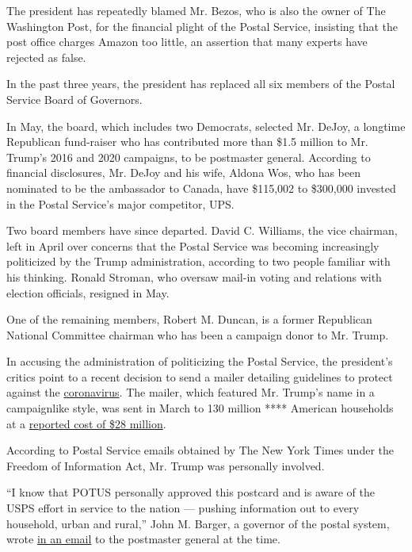 The president has repeatedly blamed Mr. Bezos, who is also the owner of
The Washington Post, for the financial plight of the Postal Service,
insisting that the post office charges Amazon too little, an assertion
that many experts have rejected as false.

In the past three years, the president has replaced all six members of
the Postal Service Board of Governors.

In May, the board, which includes two Democrats, selected Mr. DeJoy, a
longtime Republican fund-raiser who has contributed more than \$1.5
million to Mr. Trump's 2016 and 2020 campaigns, to be postmaster
general. According to financial disclosures, Mr. DeJoy and his wife,
Aldona Wos, who has been nominated to be the ambassador to Canada, have
\$115,002 to \$300,000 invested in the Postal Service's major
competitor, UPS.

Two board members have since departed. David C. Williams, the vice
chairman, left in April over concerns that the Postal Service was
becoming increasingly politicized by the Trump administration, according
to two people familiar with his thinking. Ronald Stroman, who oversaw
mail-in voting and relations with election officials, resigned in May.

One of the remaining members, Robert M. Duncan, is a former Republican
National Committee chairman who has been a campaign donor to Mr. Trump.

In accusing the administration of politicizing the Postal Service, the
president's critics point to a recent decision to send a mailer
detailing guidelines to protect against the
\href{https://www.nytimes3xbfgragh.onion/interactive/2020/us/coronavirus-us-cases.htmlhttps://www.nytimes3xbfgragh.onion/interactive/2020/us/coronavirus-us-cases.html}{coronavirus}.
The mailer, which featured Mr. Trump's name in a campaignlike style, was
sent in March to 130 million **** American households at a
\href{https://www.usatoday.com/story/news/politics/2020/05/28/coronavirus-post-card-trump-cost-post-office-28-million/5274034002/}{reported
cost of \$28 million}.

According to Postal Service emails obtained by The New York Times under
the Freedom of Information Act, Mr. Trump was personally involved.

``I know that POTUS personally approved this postcard and is aware of
the USPS effort in service to the nation --- pushing information out to
every household, urban and rural,'' John M. Barger, a governor of the
postal system, wrote
\href{https://www.documentcloud.org/documents/7010858-USPS-Email-Trump-Personally-Approved-28M.html}{in
an email} to the postmaster general at the time.

